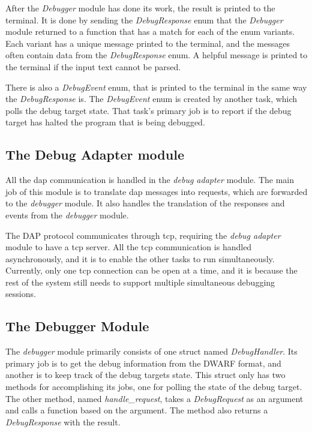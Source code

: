 After the \emph{Debugger} module has done its work, the result is printed to the terminal.
It is done by sending the \emph{DebugResponse} enum that the \emph{Debugger} module returned to a function that has a match for each of the enum variants.
Each variant has a unique message printed to the terminal, and the messages often contain data from the \emph{DebugResponse} enum.
A helpful message is printed to the terminal if the input text cannot be parsed.


There is also a \emph{DebugEvent} enum, that is printed to the terminal in the same way the \emph{DebugResponse} is.
The \emph{DebugEvent} enum is created by another task, which polls the debug target state.
That task's primary job is to report if the debug target has halted the program that is being debugged.



\subsection{The Debug Adapter module}
All the \gls{dap} communication is handled in the \emph{debug adapter} module.
The main job of this module is to translate \gls{dap} messages into requests, which are forwarded to the \emph{debugger} module.
It also handles the translation of the responses and events from the \emph{debugger} module.


The DAP protocol communicates through \gls{tcp}, requiring the \emph{debug adapter} module to have a \gls{tcp} server.
All the \gls{tcp} communication is handled asynchronously, and it is to enable the other tasks to run simultaneously.
Currently, only one \gls{tcp} connection can be open at a time, and it is because the rest of the system still needs to support multiple simultaneous debugging sessions.



\subsection{The Debugger Module}
The \emph{debugger} module primarily consists of one struct named \emph{DebugHandler}.
Its primary job is to get the debug information from the \gls{DWARF} format, and another is to keep track of the debug targets state.
This struct only has two methods for accomplishing its jobs, one for polling the state of the debug target.
The other method, named \emph{handle\_request}, takes a \emph{DebugRequest} as an argument and calls a function based on the argument.
The method also returns a \emph{DebugResponse} with the result.


